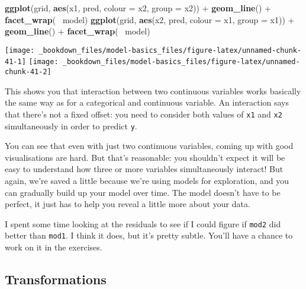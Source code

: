 \documentclass[]{book}
\newenvironment{Shaded}{\begin{snugshade}}{\end{snugshade}}
\newcommand{\KeywordTok}[1]{\textcolor[rgb]{0.13,0.29,0.53}{\textbf{{#1}}}}
\newcommand{\DataTypeTok}[1]{\textcolor[rgb]{0.13,0.29,0.53}{{#1}}}
\newcommand{\StringTok}[1]{\textcolor[rgb]{0.31,0.60,0.02}{{#1}}}
\newcommand{\NormalTok}[1]{{#1}}
\begin{document}
\begin{Shaded}
\begin{Highlighting}[]
\KeywordTok{ggplot}\NormalTok{(grid, }\KeywordTok{aes}\NormalTok{(x1, pred, }\DataTypeTok{colour =} \NormalTok{x2, }\DataTypeTok{group =} \NormalTok{x2)) +}\StringTok{ }
\StringTok{  }\KeywordTok{geom_line}\NormalTok{() +}
\StringTok{  }\KeywordTok{facet_wrap}\NormalTok{(~}\StringTok{ }\NormalTok{model)}
\KeywordTok{ggplot}\NormalTok{(grid, }\KeywordTok{aes}\NormalTok{(x2, pred, }\DataTypeTok{colour =} \NormalTok{x1, }\DataTypeTok{group =} \NormalTok{x1)) +}\StringTok{ }
\StringTok{  }\KeywordTok{geom_line}\NormalTok{() +}
\StringTok{  }\KeywordTok{facet_wrap}\NormalTok{(~}\StringTok{ }\NormalTok{model)}
\end{Highlighting}
\end{Shaded}

\begin{center}\texttt{[image: \_bookdown\_files/model-basics\_files/figure-latex/unnamed-chunk-41-1]} \texttt{[image: \_bookdown\_files/model-basics\_files/figure-latex/unnamed-chunk-41-2]} \end{center}

This shows you that interaction between two continuous variables works
basically the same way as for a categorical and continuous variable. An
interaction says that there's not a fixed offset: you need to consider
both values of \texttt{x1} and \texttt{x2} simultaneously in order to
predict \texttt{y}.

You can see that even with just two continuous variables, coming up with
good visualisations are hard. But that's reasonable: you shouldn't
expect it will be easy to understand how three or more variables
simultaneously interact! But again, we're saved a little because we're
using models for exploration, and you can gradually build up your model
over time. The model doesn't have to be perfect, it just has to help you
reveal a little more about your data.

I spent some time looking at the residuals to see if I could figure if
\texttt{mod2} did better than \texttt{mod1}. I think it does, but it's
pretty subtle. You'll have a chance to work on it in the exercises.

\subsection{Transformations}\label{transformations}
\end{document}
